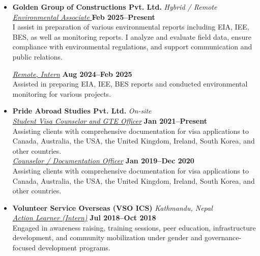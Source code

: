 \documentclass[a4paper,11.5pt]{article}
\begin{document}
\begin{itemize}

    \item \textbf{Golden Group of Constructions Pvt. Ltd.} \hfill \textit{Hybrid / Remote} \\
    \underline{\textit{Environmental Associate }} \hfill \textbf{Feb 2025--Present} \\

        I assist in preparation of various environmental reports including EIA, IEE, BES, as well as monitoring reports. I analyze and evaluate field data, ensure compliance with environmental regulations, and support communication and public relations.
  
    \underline{\textit{Remote, Intern}} \hfill \textbf{Aug 2024--Feb 2025} \\
    
        Assisted in preparing EIA, IEE, BES reports and conducted environmental monitoring for various projects.

    \item
    \textbf{Pride Abroad Studies Pvt. Ltd.} \hfill \textit{On-site} \\
    \underline{\textit{Student Visa Counselor and GTE Officer}} \hfill \textbf{Jan 2021--Present} \\

    Assisting clients with comprehensive documentation for visa applications to Canada, Australia, the USA, the United Kingdom, Ireland, South Korea, and other countries.\\

    \underline{\textit{Counselor / Documentation Officer}} \hfill \textbf{Jan 2019--Dec 2020} \\

    Assisting clients with comprehensive documentation for visa applications to Canada, Australia, the USA, the United Kingdom, Ireland, South Korea, and other countries.

    \item
    \textbf{Volunteer Service Overseas (VSO ICS)} \hfill \textit{Kathmandu, Nepal} \\
    \underline{\textit{Action Learner (Intern)}} \hfill \textbf{Jul 2018--Oct 2018} \\
    Engaged in awareness raising, training sessions, peer education, infrastructure development, and community mobilization under gender and governance-focused development programs.

\end{itemize}
\end{document}
